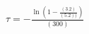 \documentclass[preview]{standalone}
\begin{document}
\begin{center}
$\tau = -\frac{\ln\left(1-\frac{(3.2)}{(5.2))}\right)}{(300)}$
\end{center}
\end{document}
